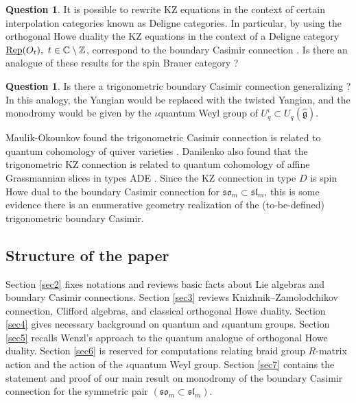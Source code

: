 \documentclass[10pt]{amsart}
\numberwithin{equation}{section}
\theoremstyle{definition}
\newtheorem{question}[theorem]{Question}
\let\hat=\widehat
\def\C{{\mathbb C}}
\newcommand{\slm}{\mathfrak{sl}_{m}}
\newcommand{\som}[1][m]{\mathfrak{so}_{#1}}
\newcommand{\g}{\mathfrak{g}}
\begin{document}
\begin{question}
    It is possible to rewrite KZ equations in the context of certain interpolation categories known as Deligne categories. In particular, by using the orthogonal Howe duality the KZ equations in the context of a Deligne category $\underline{\smash{{\rm Rep}}}(O_t), \ t\in \C \setminus \mathbb{Z}$, correspond to the boundary Casimir connection \cite{MR5067248}. Is there an analogue of these results for the spin Brauer category \cite{MR4824565, mcnamara2025quantumspinbrauercategory}?
\end{question}

\begin{question}
    Is there a trigonometric boundary Casimir connection generalizing \cite{MR3087943,MR2769327}? In this analogy, the Yangian would be replaced with the twisted Yangian, and the monodromy would be given by the $\iota$quantum Weyl group of $U_q^{\iota}\subset U_q(\hat{\g})$.
\end{question}


    Maulik-Okounkov found the trigonometric Casimir connection is related to quantum cohomology of quiver varieties \cite{MR3951025}. Danilenko also found that the trigonometric KZ connection is related to quantum cohomology of affine Grassmannian slices in types ADE \cite{MR4779057}. Since the KZ connection in type $D$ is spin Howe dual to the boundary Casimir connection for $\som\subset \slm$, this is some evidence there is an enumerative geometry realization of the (to-be-defined) trigonometric boundary Casimir.
    
\subsection*{Structure of the paper}

Section \ref{sec2} fixes notations and reviews basic facts about Lie algebras and boundary Casimir connections. Section \ref{sec3} reviews Knizhnik–Zamolodchikov connection, Clifford algebras, and classical orthogonal Howe duality. Section \ref{sec4} gives necessary background on quantum and $\iota$quantum groups. Section \ref{sec5} recalls Wenzl's approach to the quantum analogue of orthogonal Howe duality. Section \ref{sec6} is reserved for computations relating braid group $R$-matrix action and the action of the $\iota$quantum Weyl group. Section \ref{sec7} contains the statement and proof of our main result on monodromy of the boundary Casimir connection for the symmetric pair $(\som\subset\slm)$.
\end{document}
